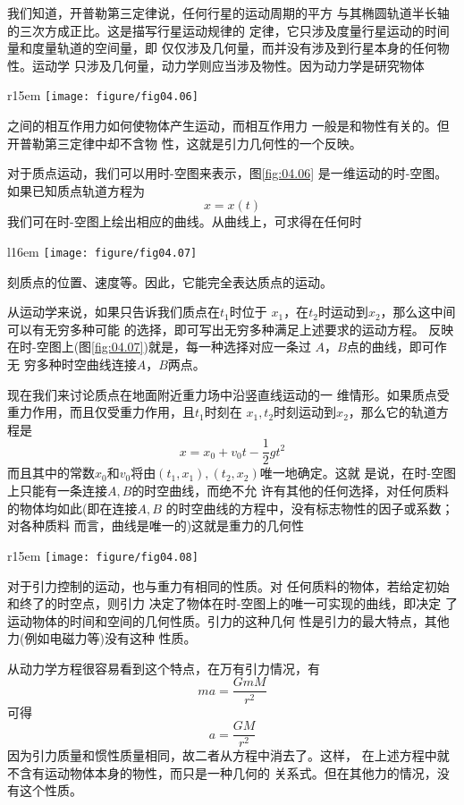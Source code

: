 我们知道，开普勒第三定律说，任何行星的运动周期的平方
与其椭圆轨道半长轴的三次方成正比。这是描写行星运动规律的
定律，它只涉及度量行星运动的时间量和度量轨道的空间量，即
仅仅涉及几何量，而并没有涉及到行星本身的任何物性。运动学
只涉及几何量，动力学则应当涉及物性。因为动力学是研究物体
\begin{wrapfigure}[10]{r}{15em}
  \centering
  \texttt{[image: figure/fig04.06]}
  \caption{一维运动的时-空图}
  \label{fig:04.06}
\end{wrapfigure}
之间的相互作用力如何使物体产生运动，而相互作用力
一般是和物性有关的。但开普勒第三定律中却不含物
性，这就是引力几何性的一个反映。

对于质点运动，我们可以用时-空图来表示，图\ref{fig:04.06}
是一维运动的时-空图。如果已知质点轨道方程为
\begin{equation*}
  x = x \left( t \right)
\end{equation*}
我们可在时-空图上绘出相应的曲线。从曲线上，可求得在任何时
\begin{wrapfigure}[11]{l}{16em}
  \vspace{-1em}
  \centering
  \texttt{[image: figure/fig04.07]}
  \caption{$ A $，$ B $之间可能的运动}
  \label{fig:04.07}
\end{wrapfigure}
刻质点的位置、速度等。因此，它能完全表达质点的运动。

从运动学来说，如果只告诉我们质点在$ t_1 $时位于
$ x_1 $，在$ t_2 $时运动到$ x_2 $，那么这中间可以有无穷多种可能
的选择，即可写出无穷多种满足上述要求的运动方程。
反映在时-空图上(图\ref{fig:04.07})就是，每一种选择对应一条过
$ A $，$ B $点的曲线，即可作无
穷多种时空曲线连接$ A $，$ B $两点。

现在我们来讨论质点在地面附近重力场中沿竖直线运动的一
维情形。如果质点受重力作用，而且仅受重力作用，且$ t _ { 1 } $时刻在
$ x _ { 1 } , t _ { 2 } $时刻运动到$ x _ { 2 } $，那么它的轨道方程是
\begin{equation*}
  x = x _ { 0 } + v _ { 0 } t - \frac { 1 } { 2 } g t ^ { 2 }
\end{equation*}
而且其中的常数$ x _ { 0 } $和$ v _ { 0 } $将由$ \left( t _ { 1 }, x _ { 1 } \right) , \left( t _ { 2 } , x _ { 2 } \right) $唯一地确定。这就
是说，在时-空图上只能有一条连接$ A , B $的时空曲线，而绝不允
许有其他的任何选择，对任何质料的物体均如此(即在连接$ A , B $
的时空曲线的方程中，没有标志物性的因子或系数；对各种质料
而言，曲线是唯一的)这就是重力的几何性

\begin{wrapfigure}[11]{r}{15em}
  \centering
  \texttt{[image: figure/fig04.08]}
  \caption{$ A $，$ B $之间唯一可实现的时空曲线}
  \label{fig:04.08}
\end{wrapfigure}
对于引力控制的运动，也与重力有相同的性质。对
任何质料的物体，若给定初始和终了的时空点，则引力
决定了物体在时-空图上的唯一可实现的曲线，即决定
了运动物体的时间和空间的几何性质。引力的这种几何
性是引力的最大特点，其他力(例如电磁力等)没有这种
性质。

从动力学方程很容易看到这个特点，在万有引力情况，有
\begin{equation*}
  m a = \frac { G m M } { r ^ { 2 } }
\end{equation*}
可得
\begin{equation*}
  a = \frac { G M } { r ^ { 2 } }
\end{equation*}
因为引力质量和惯性质量相同，故二者从方程中消去了。这样，
\clearpage\noindent
在上述方程中就不含有运动物体本身的物性，而只是一种几何的
关系式。但在其他力的情况，没有这个性质。
